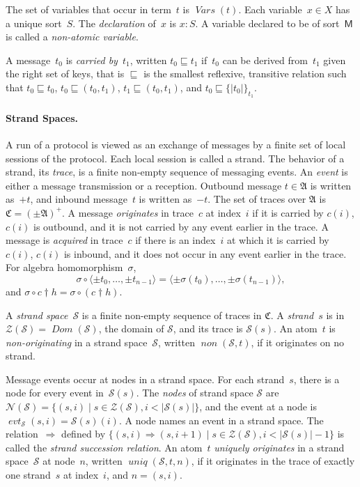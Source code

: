 \documentclass[12pt]{article}
\newcommand{\fn}[1]{\ensuremath{\operatorname{\mathit{#1}}}}
\newcommand{\srt}[1]{\ensuremath{\mathsf{#1}}}
\newcommand{\typ}{\mathbin:}
\newcommand{\sdom}{\fn{Dom}}
\newcommand{\vars}{\fn{Vars}}
\newcommand{\seq}[1]{\ensuremath{\langle#1\rangle}}
\newcommand{\prefix}[2]{#1\dagger#2}
\newcommand{\enc}[2]{\ensuremath{\{\!|#1|\!\}_{#2}}}
\newcommand{\inbnd}{\mathord -}
\newcommand{\outbnd}{\mathord +}
\newcommand{\alg}[1]{\ensuremath{\mathfrak{#1}}}
\newcommand{\msg}{\alg{A}}
\newcommand{\ssp}{\ensuremath{\mathcal{S}}}
\newcommand{\strands}{\ensuremath{\mathcal{Z}}}
\newcommand{\nodes}{\ensuremath{\mathcal{N}}}
\newcommand{\tr}{\ensuremath{\mathfrak C}}
\newcommand{\evt}{\fn{evt}}
\begin{document}
The set of variables that occur in term~$t$ is $\vars(t)$.  Each
variable~$x\in X$ has a unique sort~$S$.  The \emph{declaration}
of~$x$ is $x\typ S$.  A variable declared to be of sort~\srt{M} is
called a \emph{non-atomic variable}.

A message~$t_0$ is \emph{carried by}~$t_1$, written $t_0\sqsubseteq
t_1$ if~$t_0$ can be derived from~$t_1$ given the right set of keys,
that is $\sqsubseteq$ is the smallest reflexive, transitive relation
such that $t_0\sqsubseteq t_0$, $t_0\sqsubseteq (t_0, t_1)$,
$t_1\sqsubseteq (t_0, t_1)$, and $t_0\sqsubseteq\enc{t_0}{t_1}$.

\paragraph{Strand Spaces.}
A run of a protocol is viewed as an exchange of messages by a finite
set of local sessions of the protocol.  Each local session is called a
strand.  The behavior of a strand, its \emph{trace}, is a finite
non-empty sequence of messaging events.  An \emph{event} is either a
message transmission or a reception.  Outbound message $t\in\msg$ is
written as~$\outbnd t$, and inbound message~$t$ is written as~$\inbnd
t$.  The set of traces over $\msg$ is $\tr=(\pm\msg)^+$.  A message
\emph{originates} in trace~$c$ at index~$i$ if it is carried by
$c(i)$, $c(i)$ is outbound, and it is not carried by any event earlier
in the trace.  A message is \emph{acquired} in trace~$c$ if there is
an index~$i$ at which it is carried by $c(i)$, $c(i)$ is inbound, and
it does not occur in any event earlier in the trace.  For algebra
homomorphism~$\sigma$, \[\sigma\circ\seq{\pm t_0,\ldots,\pm t_{n-1}}=
\seq{\pm \sigma(t_0),\ldots,\pm \sigma(t_{n-1})},\]
and $\sigma\circ\prefix{c}{h}=\sigma\circ(\prefix{c}{h})$.

A \emph{strand space}~{\ssp} is a finite non-empty sequence of traces
in $\tr$.  A \emph{strand}~$s$ is in $\strands(\ssp)=\sdom(\ssp)$, the
domain of $\ssp$, and its trace is $\ssp(s)$.  An atom~$t$ is
\emph{non-originating} in a strand space~$\ssp$, written
$\fn{non}(\ssp,t)$, if it originates on no strand.

Message events occur at nodes in a strand space.  For each strand~$s$,
there is a node for every event in~$\ssp(s)$.  The \emph{nodes} of
strand space $\ssp$ are $\nodes(\ssp)=\{(s,i)\mid s\in\strands(\ssp),
i < |\ssp(s)|\}$, and the event at a node is
$\evt_\ssp(s,i)=\ssp(s)(i)$.  A node names an event in a strand space.
The relation~$\Rightarrow$ defined by $\{(s,i)\Rightarrow(s,i+1)\mid
s\in\strands(\ssp), i<|\ssp(s)|-1\}$ is called the \emph{strand
  succession relation}.  An atom~$t$ \emph{uniquely originates} in a
strand space~$\ssp$ at node~$n$, written $\fn{uniq}(\ssp,t,n)$, if it
originates in the trace of exactly one strand~$s$ at index~$i$, and
$n=(s,i)$.
\end{document}
